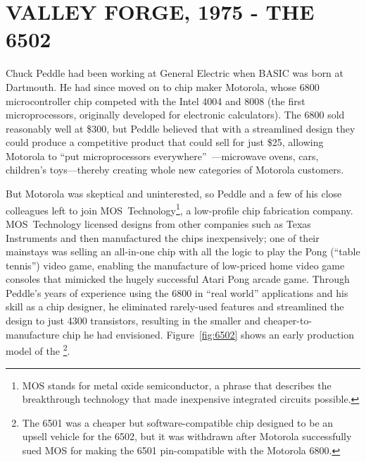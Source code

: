 
\section{VALLEY FORGE, 1975 - THE 6502}


Chuck Peddle had been working at General Electric when BASIC was
born at Dartmouth.  He had since moved on to chip maker Motorola, whose 6800
microcontroller chip competed with the Intel 4004 and
8008 (the first microprocessors, originally developed for
electronic calculators).  The 6800 sold reasonably well at \$300, but
Peddle  believed that with a streamlined design they could
produce a competitive product that could sell for just \$25,
allowing Motorola to ``put
microprocessors everywhere''~\cite[p. 31]{commodore}---microwave ovens,
cars, children's toys---thereby creating whole new categories of Motorola customers.

But Motorola was skeptical and uninterested, so Peddle and a few of his close
colleagues left to join MOS~Technology\footnote{MOS stands
  for metal oxide 
semiconductor, a phrase that describes the breakthrough technology that
made inexpensive integrated circuits possible.}, a low-profile chip
fabrication company.  MOS~Technology licensed designs from other
companies such as Texas Instruments and then 
manufactured the chips inexpensively; one of their mainstays was 
selling an all-in-one chip with all the logic to play the Pong (``table
tennis'') video game, enabling the manufacture of low-priced home video game
consoles that mimicked the hugely successful Atari Pong arcade game.
Through Peddle's years
of experience using the 6800 in ``real world'' applications and his
skill as a chip designer,
he eliminated rarely-used features and streamlined the design
to just 4300 transistors, resulting in the smaller and
cheaper-to-manufacture chip he had envisioned.  Figure~\ref{fig:6502}
shows an early production model of the \footnote{The 6501 was a 
  cheaper but software-compatible chip designed to be an upsell
  vehicle for the 6502, but it was withdrawn after Motorola successfully
  sued MOS for making the 6501 
  pin-compatible with the Motorola 6800.}.


